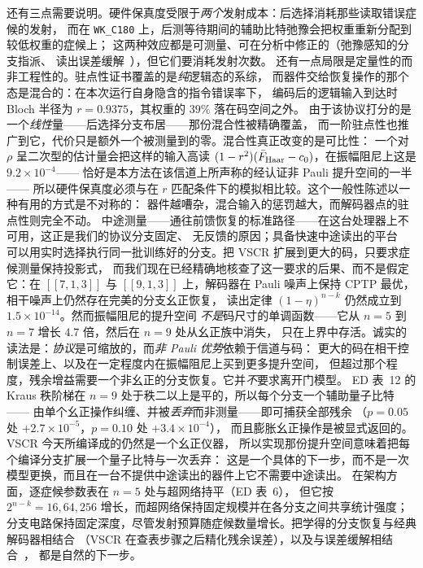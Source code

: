 \documentclass[11pt,a4paper]{article}
\begin{document}
还有三点需要说明。硬件保真度受限于\emph{两个}发射成本：后选择消耗那些读取错误症候的发射，
而在 \texttt{WK\_C180} 上，后测等待期间的辅助比特弛豫会把权重重新分配到较低权重的症候上；
这两种效应都是可测量、可在分析中修正的（弛豫感知的分支指派、
读出误差缓解~\cite{vandenberg_readout}），但它们要消耗发射次数。
还有一点局限是定量性的而非工程性的。驻点性证书覆盖的是\emph{纯}逻辑态的系综，
而器件交给恢复操作的那个态是混合的：在本次运行自身隐含的指令错误率下，
编码后的逻辑输入到达时 Bloch 半径为 $r=0.9375$，其权重的 $39\%$ 落在码空间之外。
由于该协议打分的是一个\emph{线性}量——后选择分支布居——那份混合性被精确覆盖，
而一阶驻点性也推广到它，代价只是额外一个被测量到的零。混合性真正改变的是可比性：
一个对 $\rho$ 呈二次型的估计量会把这样的输入高读
$(1-r^2)(\bar F_{\rm Haar}-c_0)$，在振幅阻尼上这是 $9.2\times10^{-4}$——
恰好是本方法在该信道上所声称的经认证非 Pauli 提升空间的一半——
所以硬件保真度必须与在 $r$ 匹配条件下的模拟相比较。这个一般性陈述以一种有用的方式是不对称的：
器件越嘈杂，混合输入的惩罚越大，而解码器点的驻点性则完全不动。
中途测量——通往前馈恢复的标准路径——在这台处理器上不可用，这正是我们的协议分支固定、
无反馈的原因；具备快速中途读出的平台~\cite{sivak_breakeven,ryan_anderson_rt}
可以用实时选择执行同一批训练好的分支。把 VSCR 扩展到更大的码，只要求症候测量保持投影式，
而我们现在已经精确地核查了这一要求的后果、而不是假定它：在 $[\![7,1,3]\!]$ 与
$[\![9,1,3]\!]$ 上，解码器在 Pauli 噪声上保持 CPTP 最优，相干噪声上仍然存在完美的分支幺正恢复，
读出定律 $(1-\eta)^{n-k}$ 仍然成立到 $1.5\times10^{-14}$。然而振幅阻尼的提升空间
\emph{不是}码尺寸的单调函数——它从 $n=5$ 到 $n=7$ 增长 $4.7$ 倍，然后在 $n=9$ 处从幺正族中消失，
只在上界中存活。诚实的读法是：\emph{协议}是可缩放的，而\emph{非 Pauli 优势}依赖于信道与码：
更大的码在相干控制误差上、以及在一定程度内在振幅阻尼上买到更多提升空间，
但超过那个程度，残余增益需要一个非幺正的分支恢复。它并\emph{不}要求离开门模型。
ED 表~12 的 Kraus 秩阶梯在 $n=9$ 处于秩二以上是平的，所以每个分支一个辅助量子比特——
由单个幺正操作纠缠、并被\emph{丢弃}而非测量——即可捕获全部残余
（$p=0.05$ 处 $+2.7\times10^{-5}$，$p=0.10$ 处 $+3.4\times10^{-4}$），
而且膨胀幺正操作是被显式返回的。VSCR 今天所编译成的仍然是一个幺正仪器，
所以实现那份提升空间意味着把每个编译分支扩展一个量子比特与一次丢弃：
这是一个具体的下一步，而不是一次模型更换，而且在一台不提供中途读出的器件上它不需要中途读出。
在架构方面，逐症候参数表在 $n=5$ 处与超网络持平（ED 表~6），
但它按 $2^{n-k}=16,64,256$ 增长，而超网络保持固定规模并在各分支之间共享统计强度；
分支电路保持固定深度，尽管发射预算随症候数量增长。把学得的分支恢复与经典解码器相结合
（VSCR 在查表步骤之后精化残余误差），以及与误差缓解相结合~\cite{cai_em_review,suzuki_em}，
都是自然的下一步。
\end{document}
